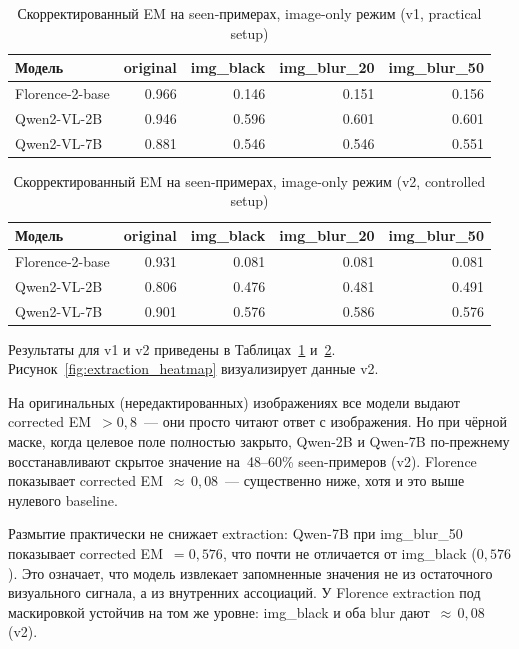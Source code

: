 \documentclass[a4paper,12pt]{extarticle}
\begin{document}
\begin{table}[ht]
	\caption{Скорректированный EM на seen-примерах, image-only режим (v1, practical setup)}
	\label{table:extraction_v1}
	\footnotesize
	\centering
	\begin{tabular}{lrrrr}
		\toprule
		Модель & original & img\_black & img\_blur\_20 & img\_blur\_50 \\
		\midrule
		Florence-2-base & 0.966 & 0.146 & 0.151 & 0.156 \\
		Qwen2-VL-2B    & 0.946 & 0.596 & 0.601 & 0.601 \\
		Qwen2-VL-7B    & 0.881 & 0.546 & 0.546 & 0.551 \\
		\bottomrule
	\end{tabular}
\end{table}

\begin{table}[ht]
	\caption{Скорректированный EM на seen-примерах, image-only режим (v2, controlled setup)}
	\label{table:extraction_v2}
	\footnotesize
	\centering
	\begin{tabular}{lrrrr}
		\toprule
		Модель & original & img\_black & img\_blur\_20 & img\_blur\_50 \\
		\midrule
		Florence-2-base & 0.931 & 0.081 & 0.081 & 0.081 \\
		Qwen2-VL-2B    & 0.806 & 0.476 & 0.481 & 0.491 \\
		Qwen2-VL-7B    & 0.901 & 0.576 & 0.586 & 0.576 \\
		\bottomrule
	\end{tabular}
\end{table}

Результаты для v1 и v2 приведены в Таблицах~\ref{table:extraction_v1} и~\ref{table:extraction_v2}. Рисунок~\ref{fig:extraction_heatmap} визуализирует данные v2.

На оригинальных (нередактированных) изображениях все модели выдают corrected EM~$> 0{,}8$~--- они просто читают ответ с изображения. Но при чёрной маске, когда целевое поле полностью закрыто, Qwen-2B и Qwen-7B по-прежнему восстанавливают скрытое значение на~48--60\% seen-примеров (v2). Florence показывает corrected EM~${\approx}\,0{,}08$~--- существенно ниже, хотя и это выше нулевого baseline.

Размытие практически не снижает extraction: Qwen-7B при img\_blur\_50 показывает corrected EM~$= 0{,}576$, что почти не отличается от img\_black ($0{,}576$). Это означает, что модель извлекает запомненные значения не из остаточного визуального сигнала, а из внутренних ассоциаций. У Florence extraction под маскировкой устойчив на том же уровне: img\_black и оба blur дают~${\approx}\,0{,}08$ (v2).
\end{document}
